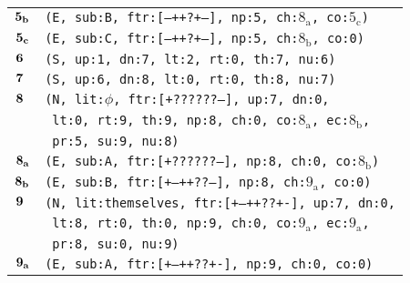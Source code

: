 \documentclass{article}
\begin{document}
\begin{minipage}{\textwidth}
{\begin{tabular}{|r|l|}
    ${\textbf{\textrm{5}}_{\textbf{\textrm{b}}}}$ & \texttt{\texttt{(E,~sub:B,~ftr:[---++?+--],~np:5,~ch:${\textrm{8}_{\textrm{a}}}$,~co:${\textrm{5}_{\textrm{c}}}$)}} \\
    ${\textbf{\textrm{5}}_{\textbf{\textrm{c}}}}$ & \texttt{\texttt{(E,~sub:C,~ftr:[---++?+--],~np:5,~ch:${\textrm{8}_{\textrm{b}}}$,~co:0)}} \\
    ${\textbf{\textrm{6}}_{\phantom{z}}}$ & \texttt{\texttt{(S,~up:1,~dn:7,~lt:2,~rt:0,~th:7,~nu:6)}} \\
    ${\textbf{\textrm{7}}_{\phantom{z}}}$ & \texttt{\texttt{(S,~up:6,~dn:8,~lt:0,~rt:0,~th:8,~nu:7)}} \\
    ${\textbf{\textrm{8}}_{\phantom{z}}}$ & \texttt{\texttt{(N,~lit:$\phi$,~ftr:[+??????--],~up:7,~dn:0,}} \\
    & \texttt{\texttt{~lt:0,~rt:9,~th:9,~np:8,~ch:0,~co:${\textrm{8}_{\textrm{a}}}$,~ec:${\textrm{8}_{\textrm{b}}}$,}} \\
    & \texttt{\texttt{~pr:5,~su:9,~nu:8)}} \\
    ${\textbf{\textrm{8}}_{\textbf{\textrm{a}}}}$ & \texttt{\texttt{(E,~sub:A,~ftr:[+??????--],~np:8,~ch:0,~co:${\textrm{8}_{\textrm{b}}}$)}} \\
    ${\textbf{\textrm{8}}_{\textbf{\textrm{b}}}}$ & \texttt{\texttt{(E,~sub:B,~ftr:[+--++??--],~np:8,~ch:${\textrm{9}_{\textrm{a}}}$,~co:0)}} \\
    ${\textbf{\textrm{9}}_{\phantom{z}}}$ & \texttt{\texttt{(N,~lit:themselves,~ftr:[+--++??+-],~up:7,~dn:0,}} \\
    & \texttt{\texttt{~lt:8,~rt:0,~th:0,~np:9,~ch:0,~co:${\textrm{9}_{\textrm{a}}}$,~ec:${\textrm{9}_{\textrm{a}}}$,}} \\
    & \texttt{\texttt{~pr:8,~su:0,~nu:9)}} \\
    ${\textbf{\textrm{9}}_{\textbf{\textrm{a}}}}$ & \texttt{\texttt{(E,~sub:A,~ftr:[+--++??+-],~np:9,~ch:0,~co:0)}} \\
    \hline
  \end{tabular}
  }
\end{minipage}
\bigbreak
\end{document}
